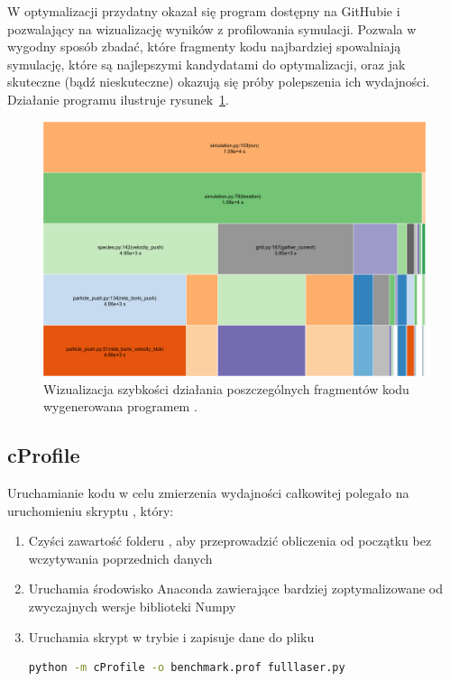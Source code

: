 W optymalizacji przydatny okazał się program \cite{snakeviz} dostępny na
GitHubie i pozwalający na wizualizację wyników z profilowania
symulacji. Pozwala w wygodny sposób zbadać, które fragmenty kodu najbardziej
spowalniają symulację, które są najlepszymi kandydatami do optymalizacji, oraz
jak skuteczne (bądź nieskuteczne) okazują się próby polepszenia ich wydajności.
Działanie programu ilustruje rysunek~\ref{fig:snakeviz}.
\begin{figure}[h!]
  \includegraphics[width=\textwidth]{Images/snakeviz}
  \caption{Wizualizacja szybkości działania poszczególnych fragmentów kodu
    wygenerowana programem .\label{fig:snakeviz}}
\end{figure}

\subsection{cProfile}
Uruchamianie kodu w celu zmierzenia wydajności całkowitej polegało na uruchomieniu skryptu , który:
\begin{enumerate}
\item Czyści zawartość folderu , aby przeprowadzić obliczenia od początku bez wczytywania poprzednich danych
\item Uruchamia środowisko Anaconda zawierające bardziej zoptymalizowane od zwyczajnych wersje biblioteki Numpy
\item Uruchamia skrypt  w trybie  i zapisuje dane do pliku 
\begin{lstlisting}[language=Bash]
   python -m cProfile -o benchmark.prof fulllaser.py
\end{lstlisting}
\end{enumerate}

